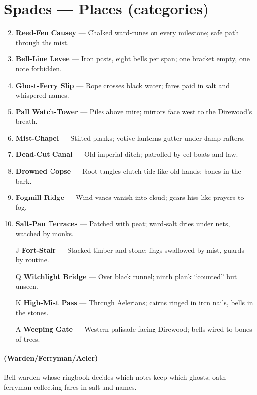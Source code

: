 \section*{Spades --- Places (categories)}
\label{sec:mistlands-places}
\begin{enumerate}
\setcounter{enumi}{1}
\item \textbf{Reed-Fen Causey} --- Chalked ward-runes on every milestone; safe path through the mist.
\item \textbf{Bell-Line Levee} --- Iron posts, eight bells per span; one bracket empty, one note forbidden.
\item \textbf{Ghost-Ferry Slip} --- Rope crosses black water; fares paid in salt and whispered names.
\item \textbf{Pall Watch-Tower} --- Piles above mire; mirrors face west to the Direwood's breath.
\item \textbf{Mist-Chapel} --- Stilted planks; votive lanterns gutter under damp rafters.
\item \textbf{Dead-Cut Canal} --- Old imperial ditch; patrolled by eel boats and law.
\item \textbf{Drowned Copse} --- Root-tangles clutch tide like old hands; bones in the bark.
\item \textbf{Fogmill Ridge} --- Wind vanes vanish into cloud; gears hiss like prayers to fog.
\item \textbf{Salt-Pan Terraces} --- Patched with peat; ward-salt dries under nets, watched by monks.
\item[J] \textbf{Fort-Stair} --- Stacked timber and stone; flags swallowed by mist, guards by routine.
\item[Q] \textbf{Witchlight Bridge} --- Over black runnel; ninth plank ``counted'' but unseen.
\item[K] \textbf{High-Mist Pass} --- Through Aelerians; cairns ringed in iron nails, bells in the stones.
\item[A] \textbf{Weeping Gate} --- Western palisade facing Direwood; bells wired to bones of trees.
\end{enumerate}

\paragraph*{(Warden/Ferryman/Aeler)} Bell-warden whose ringbook decides which notes keep which ghosts; oath-ferryman collecting fares in salt and names.

